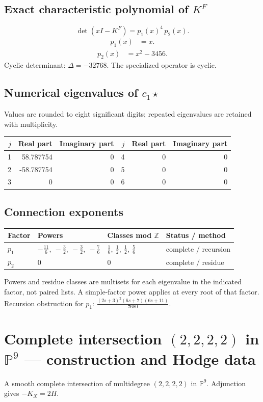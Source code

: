 \documentclass[10pt,a4paper]{article}
\begin{document}
\subsection*{Exact characteristic polynomial of $K^F$}
\[\det(xI-K^F)=p_{1}(x)^{4}\,p_{2}(x).\]
\[\begin{aligned}p_{1}(x)&=x.\end{aligned}\]
\[\begin{aligned}p_{2}(x)&=x^{2} - 3456.\end{aligned}\]
Cyclic determinant: $\Delta=-32768$. The specialized operator is cyclic.
\subsection*{Numerical eigenvalues of $c_1\star$}
Values are rounded to eight significant digits; repeated eigenvalues are retained with multiplicity.
\begin{center}\small\begin{tabular}{rrr@{\qquad}rrr}\toprule $j$ & Real part & Imaginary part & $j$ & Real part & Imaginary part\\\midrule
1 & 58.787754 & 0 & 4 & 0 & 0\\
2 & -58.787754 & 0 & 5 & 0 & 0\\
3 & 0 & 0 & 6 & 0 & 0\\
\bottomrule\end{tabular}\end{center}
\subsection*{Connection exponents}
\begin{center}\begin{tabular}{llll}\toprule Factor & Powers & Classes mod $\mathbb Z$ & Status / method\\\midrule
$p_{1}$ & $- \frac{11}{6},\ - \frac{3}{2},\ - \frac{3}{2},\ - \frac{7}{6}$ & $\frac{1}{6},\ \frac{1}{2},\ \frac{1}{2},\ \frac{5}{6}$ & complete / recursion\\
$p_{2}$ & $0$ & $0$ & complete / residue\\
\bottomrule\end{tabular}\end{center}
Powers and residue classes are multisets for each eigenvalue in the indicated factor, not paired lists. A simple-factor power applies at every root of that factor.
Recursion obstruction for $p_{1}$: $\frac{\left(2 s + 3\right)^{2} \left(6 s + 7\right) \left(6 s + 11\right)}{7680}$.
\clearpage\section*{Complete intersection $(2,2,2,2)$ in $\mathbb P^{9}$ --- construction and Hodge data}\label{entry:PCI5-2-2-2-2}
A smooth complete intersection of multidegree $(2,2,2,2)$ in $\mathbb P^{9}$.
Adjunction gives $-K_X=2H$.
\end{document}
